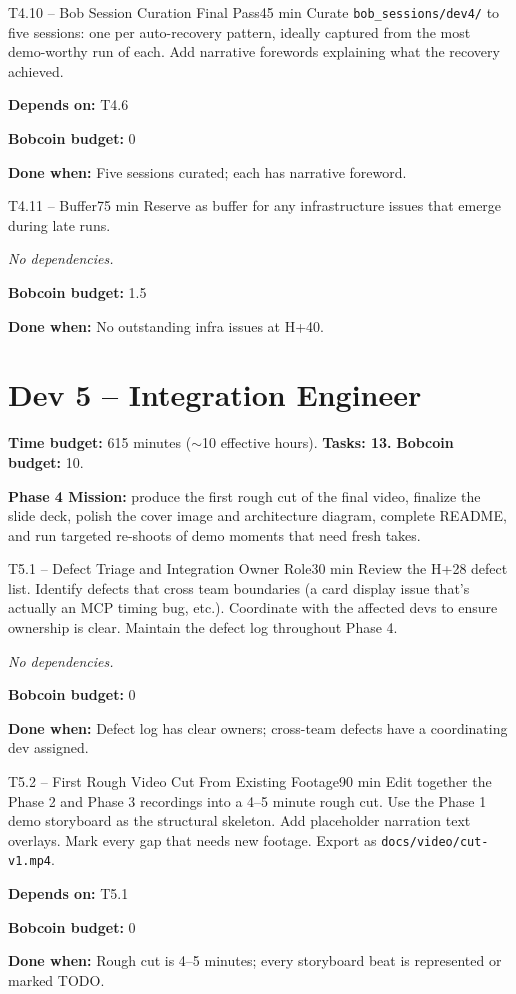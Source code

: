 \documentclass[11pt,letterpaper]{article}
\newcommand{\acceptance}[1]{\par\smallskip\textcolor{ibmgreen}{\textbf{Done when:}} #1}
\newcommand{\depends}[1]{\par\smallskip\textcolor{ibmorange}{\textbf{Depends on:}} #1}
\newcommand{\nodep}{\par\smallskip\textcolor{ibmgray}{\textit{No dependencies.}}}
\newcommand{\bobcost}[1]{\par\smallskip\textcolor{ibmaccent}{\textbf{Bobcoin budget:}} #1}
\begin{document}
\begin{task}{T4.10 -- Bob Session Curation Final Pass}{45 min}
Curate \texttt{bob\_sessions/dev4/} to five sessions: one per auto-recovery pattern, ideally captured from the most demo-worthy run of each. Add narrative forewords explaining what the recovery achieved.
\depends{T4.6}
\bobcost{0}
\acceptance{Five sessions curated; each has narrative foreword.}
\end{task}

\begin{task}{T4.11 -- Buffer}{75 min}
Reserve as buffer for any infrastructure issues that emerge during late runs.
\nodep
\bobcost{1.5}
\acceptance{No outstanding infra issues at H+40.}
\end{task}

\section{Dev 5 -- Integration Engineer}

\textbf{Time budget:} 615 minutes (${\sim}$10 effective hours). \textbf{Tasks: 13.} \textbf{Bobcoin budget:} 10.

\textbf{Phase 4 Mission:} produce the first rough cut of the final video, finalize the slide deck, polish the cover image and architecture diagram, complete README, and run targeted re-shoots of demo moments that need fresh takes.

\begin{task}{T5.1 -- Defect Triage and Integration Owner Role}{30 min}
Review the H+28 defect list. Identify defects that cross team boundaries (a card display issue that's actually an MCP timing bug, etc.). Coordinate with the affected devs to ensure ownership is clear. Maintain the defect log throughout Phase 4.
\nodep
\bobcost{0}
\acceptance{Defect log has clear owners; cross-team defects have a coordinating dev assigned.}
\end{task}

\begin{task}{T5.2 -- First Rough Video Cut From Existing Footage}{90 min}
Edit together the Phase 2 and Phase 3 recordings into a 4--5 minute rough cut. Use the Phase 1 demo storyboard as the structural skeleton. Add placeholder narration text overlays. Mark every gap that needs new footage. Export as \texttt{docs/video/cut-v1.mp4}.
\depends{T5.1}
\bobcost{0}
\acceptance{Rough cut is 4--5 minutes; every storyboard beat is represented or marked TODO.}
\end{task}
\end{document}
